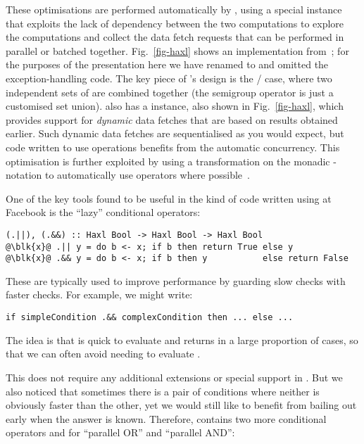 These optimisations are performed automatically by \Haxl, using a
special  instance that exploits the lack of
dependency between the two computations to explore the computations
and collect the data fetch requests that can be performed in
parallel or batched together. Fig.~\ref{fig-haxl} shows an implementation
from~\citet{marlow2014haxl}; for the purposes of the presentation here
we have renamed  to  and omitted the exception-handling code.
The key piece of \Haxl's design is the / case, where
two independent sets of  are combined together (the
semigroup operator \hs{<>} is just a customised set union). \Haxl also has a
 instance, also shown in Fig.~\ref{fig-haxl}, which provides support
for \emph{dynamic} data fetches that are based on results obtained earlier.
Such dynamic data fetches are sequentialised as you would expect, but code
written to use  operations benefits from the automatic
concurrency. This optimisation is further exploited by using a transformation
on the monadic -notation to automatically use 
operators where possible~\cite{marlow2016applicativedo}.

One of the key tools found to be useful in the kind of code written
using \Haxl at Facebook is the ``lazy'' conditional operators:

\vspace{1mm}
\begin{verbatim}
(.||), (.&&) :: Haxl Bool -> Haxl Bool -> Haxl Bool
@\blk{x}@ .|| y = do b <- x; if b then return True else y
@\blk{x}@ .&& y = do b <- x; if b then y           else return False
\end{verbatim}
\vspace{1mm}

\noindent
These are typically used to improve performance by guarding slow
checks with faster checks.  For example, we might write:

\begin{verbatim}
if simpleCondition .&& complexCondition then ... else ...
\end{verbatim}

\noindent
The idea is that  is quick to evaluate and
returns  in a large proportion of cases, so that we can
often avoid needing to evaluate .

This does not require any additional extensions or special support in
\Haxl. But we also noticed that sometimes there is a pair of conditions
where neither is obviously faster than the other, yet we would still
like to benefit from bailing out early when the answer is known.
Therefore, \Haxl contains two more conditional operators  and
 for ``parallel OR'' and ``parallel AND'':

